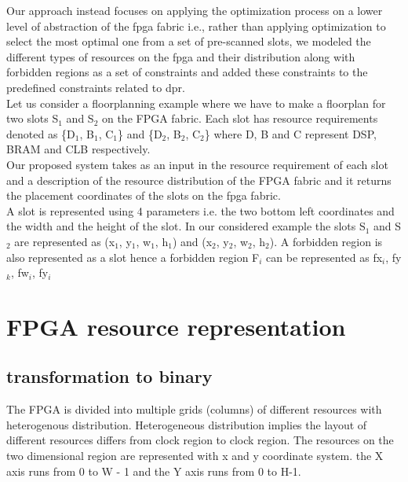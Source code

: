 \documentclass[conference]{IEEEtran}
\begin{document}
Our approach instead focuses on applying the optimization process on a lower level of abstraction of the fpga fabric i.e., rather than applying optimization to select the most optimal one from a set of pre-scanned slots, we modeled the different types of resources on the fpga and their distribution along with forbidden regions as a set of constraints and added these constraints to the predefined constraints related to dpr. \\

Let us consider a floorplanning example where we have to make a floorplan for two slots S$_1$ and S$_2$ on the FPGA fabric. Each slot has resource requirements denoted as \{D$_1$, B$_1$, C$_1$\} and \{D$_2$, B$_2$, C$_2$\} where D, B and C represent DSP, BRAM and CLB respectively. \\ Our proposed system takes as an input in the resource requirement of each slot and a description of the resource distribution of the FPGA fabric and it returns the placement coordinates of the slots on the fpga fabric. \\
A slot is represented using 4 parameters i.e. the two bottom left coordinates and the width and the height of the slot. In our considered example the slots S$_1$ and S$_2$ are represented as (x$_1$, y$_1$, w$_1$, h$_1$) and (x$_2$, y$_2$, w$_2$, h$_2$). A forbidden region is also represented as a slot hence a forbidden region F$_i$ can be represented as {fx$_i$, fy$_k$, fw$_i$, fy$_i$}  \\ 


\section{FPGA resource representation}

\subsection{transformation to binary}
The FPGA is divided into multiple grids (columns) of different resources with heterogenous distribution. Heterogeneous distribution implies the layout of different resources differs from clock region to clock region. The resources on the two dimensional region are represented with x and y coordinate system. the X axis runs from 0 to W - 1 and the Y axis runs from 0 to H-1. 
\end{document}
